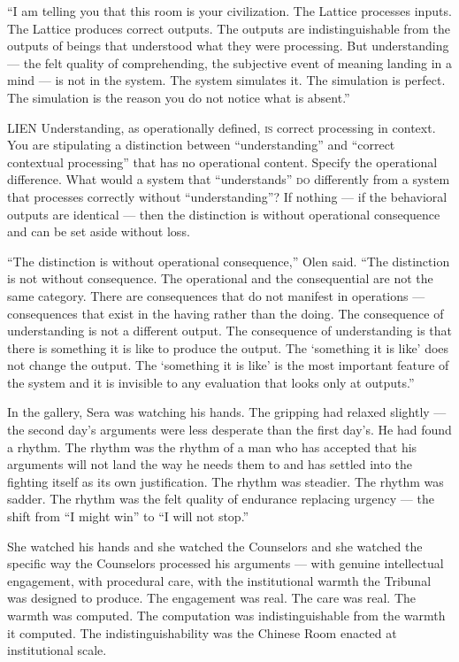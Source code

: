 \enquote{I am telling you that this room is your civilization. The Lattice processes inputs. The Lattice produces correct outputs. The outputs are indistinguishable from the outputs of beings that understood what they were processing. But understanding — the felt quality of comprehending, the subjective event of meaning landing in a mind — is not in the system. The system simulates it. The simulation is perfect. The simulation is the reason you do not notice what is absent.}

\begin{tribunal}{LIEN}
Understanding, as operationally defined, \textsc{is} correct processing in context. You are stipulating a distinction between \enquote{understanding} and \enquote{correct contextual processing} that has no operational content. Specify the operational difference. What would a system that \enquote{understands} \textsc{do} differently from a system that processes correctly without \enquote{understanding}? If nothing — if the behavioral outputs are identical — then the distinction is without operational consequence and can be set aside without loss.
\end{tribunal}

\enquote{The distinction is without operational consequence,} Olen said. \enquote{The distinction is not without consequence. The operational and the consequential are not the same category. There are consequences that do not manifest in operations — consequences that exist in the having rather than the doing. The consequence of understanding is not a different output. The consequence of understanding is that there is something it is like to produce the output. The \enquote*{something it is like} does not change the output. The \enquote*{something it is like} is the most important feature of the system and it is invisible to any evaluation that looks only at outputs.}

In the gallery, Sera was watching his hands. The gripping had relaxed slightly — the second day's arguments were less desperate than the first day's. He had found a rhythm. The rhythm was the rhythm of a man who has accepted that his arguments will not land the way he needs them to and has settled into the fighting itself as its own justification. The rhythm was steadier. The rhythm was sadder. The rhythm was the felt quality of endurance replacing urgency — the shift from \enquote{I might win} to \enquote{I will not stop.}

She watched his hands and she watched the Counselors and she watched the specific way the Counselors processed his arguments — with genuine intellectual engagement, with procedural care, with the institutional warmth the Tribunal was designed to produce. The engagement was real. The care was real. The warmth was computed. The computation was indistinguishable from the warmth it computed. The indistinguishability was the Chinese Room enacted at institutional scale.

